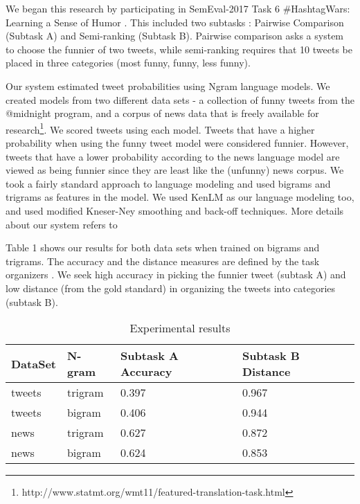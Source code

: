\documentclass[11pt,a4paper]{article}
\begin{document}
We began this research by participating in SemEval-2017 Task 6 
\#HashtagWars: Learning a Sense of Humor \cite{PotashRR17}. This included
two subtasks : Pairwise Comparison (Subtask A) and Semi-ranking 
(Subtask B). Pairwise comparison asks a system to choose the funnier of
two tweets, while semi-ranking requires that 10 tweets be placed in
three categories (most funny, funny, less funny). 


Our system
estimated tweet probabilities using Ngram language models.
We created models
from two different data sets - a collection of funny tweets from the @midnight
program, and a corpus of news data that is freely available for 
research\footnote{http://www.statmt.org/wmt11/featured-translation-task.html}. 
We scored tweets using each model. Tweets that have a higher probability 
when using the funny tweet model were considered funnier. However, tweets 
that have a lower probability according to the news language model 
are viewed as being funnier since they are least like the (unfunny) news corpus.
We took a fairly standard approach to language modeling and used bigrams 
and trigrams as features in the model. We used KenLM \cite{Heafield-estimate} as our 
language modeling too, and used modified Kneser-Ney smoothing and back-off techniques. 
More details about our system refers to

Table 1 shows our results for both data sets when trained on 
bigrams and trigrams. The accuracy and the distance measures
are defined by the task organizers \cite{PotashRR17}. We seek 
high accuracy in picking the funnier tweet (subtask A) and low
distance (from the gold standard) in organizing the tweets into 
categories (subtask B). 

\begin{table}[h]
\begin{center}
\begin{tabular}{ |p{1.2cm}|p{1.2cm}|p{1.7cm}|p{1.7cm}|}
\hline
DataSet & N-gram & Subtask A Accuracy & Subtask B Distance \\
\hline
tweets & trigram & 0.397 & 0.967 \\
\hline
tweets & bigram & 0.406 & 0.944 \\
\hline
news & trigram & 0.627 & 0.872 \\
\hline
news & bigram & 0.624 & 0.853 \\
\hline
\end{tabular}
\caption{Experimental results}
\end{center}
\end{table}
\end{document}
